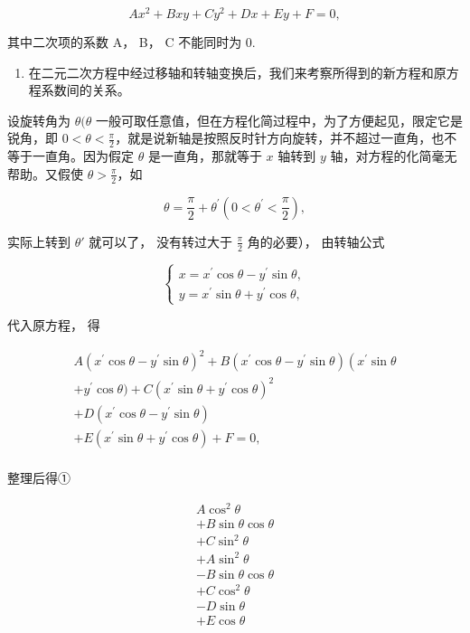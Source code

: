 \[
A x^{2} + B x y + C y^{2} + D x + E y + F = 0,
\]

其中二次项的系数 A， B， C 不能同时为 0.

\begin{enumerate}
\def\labelenumi{\arabic{enumi}.}
\tightlist
\item
  在二元二次方程中经过移轴和转轴变换后，我们来考察所得到的新方程和原方程系数间的关系。
\end{enumerate}

设旋转角为 \(\theta (\theta\)
一般可取任意值，但在方程化简过程中，为了方便起见，限定它是锐角，即
\(0 < \theta < \frac{\pi}{2}\)，就是说新轴是按照反时针方向旋转，并不超过一直角，也不等于一直角。因为假定
\(\theta\) 是一直角，那就等于 \(x\) 轴转到 \(y\)
轴，对方程的化简毫无帮助。又假使 \(\theta > \frac{\pi}{2}\)，如

\[
\theta = \frac {\pi}{2} + \theta^{\prime} \left(0 < \theta^{\prime} < \frac {\pi}{2}\right),
\]

实际上转到 \(\theta'\) 就可以了， 没有转过大于 \(\frac{\pi}{2}\)
角的必要）， 由转轴公式

\[
\left\{ \begin{array}{l} x = x^{\prime} \cos \theta - y^{\prime} \sin \theta, \\ y = x^{\prime} \sin \theta + y^{\prime} \cos \theta, \end{array} \right.
\]

代入原方程， 得

\[
\begin{array}{l} A \left(x^{\prime} \cos \theta - y^{\prime} \sin \theta\right) ^ {2} + B \left(x^{\prime} \cos \theta - y^{\prime} \sin \theta\right) \left(x^{\prime} \sin \theta \right. \\ + y^{\prime} \cos \theta) + C \left(x^{\prime} \sin \theta + y^{\prime} \cos \theta\right) ^ {2} \\ + D \left(x^{\prime} \cos \theta - y^{\prime} \sin \theta\right) \\ + E \left(x^{\prime} \sin \theta + y^{\prime} \cos \theta\right) + F = 0, \\ \end{array}
\]

整理后得①

\[
\begin{array}{l} A \cos^{2} \theta \\ + B \sin \theta \cos \theta \\ + C \sin^{2} \theta \\ + A \sin^{2} \theta \\ - B \sin \theta \cos \theta \\ + C \cos^{2} \theta \\ - D \sin \theta \\ + E \cos \theta \\ \end{array}
\]

